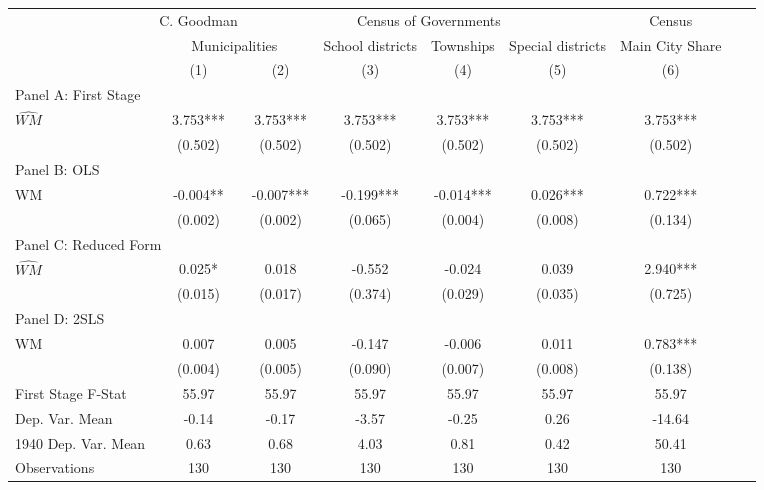  \begin{tabular}{l*{8}{c}} \toprule
&\multicolumn{1}{c}{C. Goodman}&\multicolumn{4}{c}{Census of Governments}&\multicolumn{1}{c}{Census}\\\cmidrule(lr){2-2}\cmidrule(lr){3-6}\cmidrule(lr){7-7}
&\multicolumn{2}{c}{Municipalities}&\multicolumn{1}{c}{School districts}&\multicolumn{1}{c}{Townships}&\multicolumn{1}{c}{Special districts}&\multicolumn{1}{c}{Main City Share}\\\cmidrule(lr){2-3}\cmidrule(lr){4-6}\cmidrule(lr){7-7}
&\multicolumn{1}{c}{(1)}&\multicolumn{1}{c}{(2)}&\multicolumn{1}{c}{(3)}&\multicolumn{1}{c}{(4)}&\multicolumn{1}{c}{(5)}&\multicolumn{1}{c}{(6)}\\
\cmidrule(lr){1-7}
\multicolumn{6}{l}{Panel A: First Stage}\\
\cmidrule(lr){1-7}
$\widehat{WM}$  &    3.753***&    3.753***&    3.753***&    3.753***&    3.753***&    3.753***\\
                &  (0.502)   &  (0.502)   &  (0.502)   &  (0.502)   &  (0.502)   &  (0.502)   \\
\cmidrule(lr){1-7}
\multicolumn{6}{l}{Panel B: OLS}\\
\cmidrule(lr){1-7}
WM              &   -0.004** &   -0.007***&   -0.199***&   -0.014***&    0.026***&    0.722***\\
                &  (0.002)   &  (0.002)   &  (0.065)   &  (0.004)   &  (0.008)   &  (0.134)   \\
\cmidrule(lr){1-7}
\multicolumn{6}{l}{Panel C: Reduced Form}\\
\cmidrule(lr){1-7}
$\widehat{WM}$  &    0.025*  &    0.018   &   -0.552   &   -0.024   &    0.039   &    2.940***\\
                &  (0.015)   &  (0.017)   &  (0.374)   &  (0.029)   &  (0.035)   &  (0.725)   \\
\cmidrule(lr){1-7}
\multicolumn{6}{l}{Panel D: 2SLS}\\
\cmidrule(lr){1-7}
WM              &    0.007   &    0.005   &   -0.147   &   -0.006   &    0.011   &    0.783***\\
                &  (0.004)   &  (0.005)   &  (0.090)   &  (0.007)   &  (0.008)   &  (0.138)   \\
\midrule
First Stage F-Stat&    55.97   &    55.97   &    55.97   &    55.97   &    55.97   &    55.97   \\
Dep. Var. Mean  &    -0.14   &    -0.17   &    -3.57   &    -0.25   &     0.26   &   -14.64   \\
1940 Dep. Var. Mean&     0.63   &     0.68   &     4.03   &     0.81   &     0.42   &    50.41   \\
Observations    &      130   &      130   &      130   &      130   &      130   &      130   \\
       \bottomrule \end{tabular}
